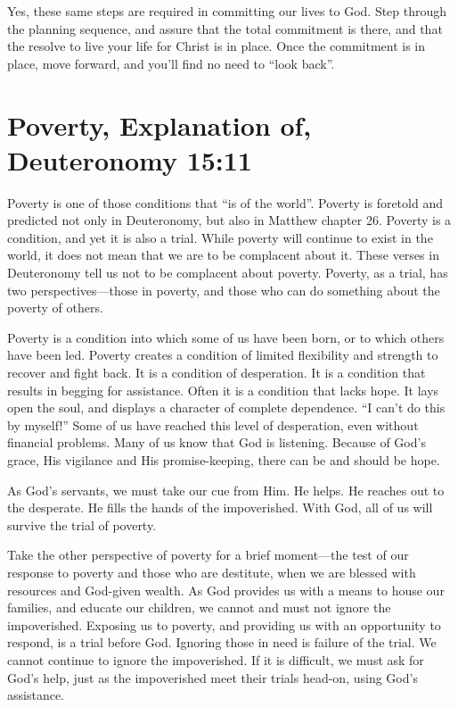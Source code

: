 \documentclass[12pt]{memoir}
\begin{document}
Yes, these same steps are required in committing our lives to God.
Step through the planning sequence, and assure that the total commitment
is there, and that the resolve to live your life for Christ is in
place. Once the commitment is in place, move forward, and you'll find
no need to ``look back''. 

\section{Poverty, Explanation of, Deuteronomy 15:11}

Poverty is one of those conditions that ``is of the world''. Poverty
is foretold and predicted not only in Deuteronomy, but also in Matthew
chapter 26. Poverty is a condition, and yet it is also a trial. While
poverty will continue to exist in the world, it does not mean that
we are to be complacent about it. These verses in Deuteronomy tell
us not to be complacent about poverty. Poverty, as a trial, has two
perspectives---those in poverty, and those who can do something about
the poverty of others. 

Poverty is a condition into which some of us have been born, or to
which others have been led. Poverty creates a condition of limited
flexibility and strength to recover and fight back. It is a condition
of desperation. It is a condition that results in begging for assistance.
Often it is a condition that lacks hope. It lays open the soul, and
displays a character of complete dependence. ``I can't do this by
myself!'' Some of us have reached this level of desperation, even
without financial problems. Many of us know that God is listening.
Because of God's grace, His vigilance and His promise-keeping, there
can be and should be hope.

As God's servants, we must take our cue from Him. He helps. He reaches
out to the desperate. He fills the hands of the impoverished. With
God, all of us will survive the trial of poverty.

Take the other perspective of poverty for a brief moment---the test
of our response to poverty and those who are destitute, when we are
blessed with resources and God-given wealth. As God provides us with
a means to house our families, and educate our children, we cannot
and must not ignore the impoverished. Exposing us to poverty, and
providing us with an opportunity to respond, is a trial before God.
Ignoring those in need is failure of the trial. We cannot continue
to ignore the impoverished. If it is difficult, we must ask for God's
help, just as the impoverished meet their trials head-on, using God's
assistance. 
\end{document}
